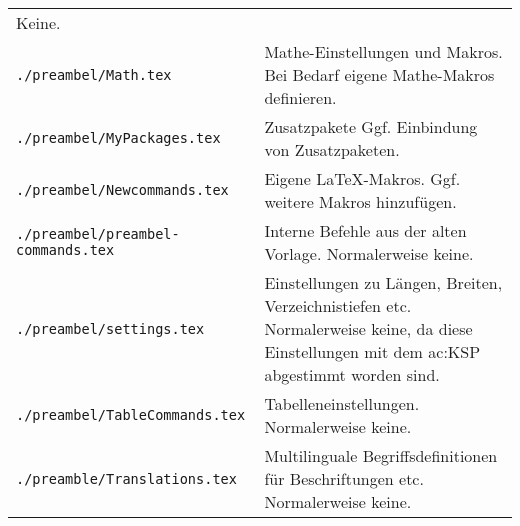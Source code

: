 \begin{longtable}{l@{\extracolsep{8pt}}X}
                                          Keine.\\
\texttt{./preambel/Math.tex}              & Mathe-Einstellungen und Makros.
                                          Bei Bedarf eigene Mathe-Makros definieren.\\
\texttt{./preambel/MyPackages.tex}        & Zusatzpakete
                                          Ggf. Einbindung von Zusatzpaketen.\\
\texttt{./preambel/Newcommands.tex}       & Eigene \LaTeX{}-Makros.
                                          Ggf. weitere Makros hinzufügen.\\
\texttt{./preambel/preambel-commands.tex} & Interne Befehle aus der alten Vorlage.
                                          Normalerweise keine.\\
\texttt{./preambel/settings.tex}          & Einstellungen zu Längen, Breiten, Verzeichnistiefen etc.
                                          Normalerweise keine, da diese Einstellungen mit dem \gls{ac:KSP} abgestimmt worden sind.\\
\texttt{./preambel/TableCommands.tex}     & Tabelleneinstellungen.
                                          Normalerweise keine.\\
\texttt{./preamble/Translations.tex}      & Multilinguale Begriffsdefinitionen für Beschriftungen etc.
                                          Normalerweise keine.\\
\bottomrule%
\end{longtable}%